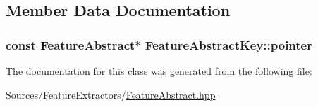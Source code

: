 \subsection{Member Data Documentation}
\hypertarget{class_feature_abstract_key_a45ece81d4ec1846f38e62318441cb185}{
\subsubsection[{pointer}]{\setlength{\rightskip}{0pt plus 5cm}const {\bf Feature\+Abstract}$\ast$ Feature\+Abstract\+Key\+::pointer}}\label{class_feature_abstract_key_a45ece81d4ec1846f38e62318441cb185}


The documentation for this class was generated from the following file\+:\begin{DoxyCompactItemize}
\item 
Sources/\+Feature\+Extractors/\hyperlink{_feature_abstract_8hpp}{Feature\+Abstract.\+hpp}\end{DoxyCompactItemize}
